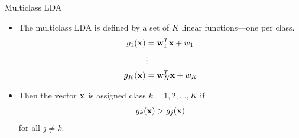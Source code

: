 \documentclass[10pt, aspectratio=169]{beamer} %
\newcommand{\w}{{\bf w}}
\newcommand{\x}{{\bf x}}
\begin{document}
\begin{frame}[fragile,allowframebreaks=0.8]{Multiclass LDA}
\begin{itemize}
\item The multiclass LDA is defined by a set of $K$ linear functions---one per class.
\begin{align*}
g_1(\x) &= \w_1^T\x + w_1\\
&\vdots \\
g_K(\x) &= \w_K^T\x + w_K\\
\end{align*}
\item Then the vector $\x$ is assigned class $k = 1,2,\ldots, K$ if
\[
g_k(\x) > g_j(\x)
\]
for all $j\ne k$.
\end{itemize}
\end{frame}
\end{document}

